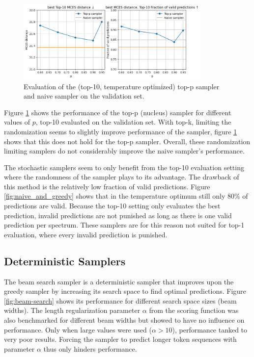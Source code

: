 \begin{figure}[h]
    \centering
    \includegraphics[width=0.85\textwidth]{figures/results/samplers/top-p.png}
    \caption{Evaluation of the (top-10, temperature optimized) top-p sampler and naive sampler on the validation set.}
    \label{fig:top-p}
\end{figure}

Figure \ref{fig:top-p} shows the performance of the top-p (nucleus) sampler for different values of $p$, top-10 evaluated on the validation set.
With top-k, limiting the randomization seems to slightly improve performance of the sampler, figure \ref{fig:top-p} shows that this does not hold for the top-p sampler.
Overall, these randomization limiting samplers do not considerably improve the naive sampler's performance.

The stochastic samplers seem to only benefit from the top-10 evaluation setting where the randomness of the sampler plays to its advantage.
The drawback of this method is the relatively low fraction of valid predictions.
Figure \ref{fig:naive_and_greedy} shows that in the temperature optimum still only $80\%$ of predictions are valid.
Because the top-10 setting only evaluates the best prediction, invalid predictions are not punished as long as there is one valid prediction per spectrum.
These samplers are for this reason not suited for top-1 evaluation, where every invalid prediction is punished.


\subsection{Deterministic Samplers}

The beam search sampler is a deterministic sampler that improves upon the greedy sampler by increasing its search space to find optimal predictions.
Figure \ref{fig:beam-search} shows its performance for different search space sizes (beam widths).
The length regularization parameter $\alpha$ from the scoring function was also benchmarked for different beam widths but showed to have no influence on performance.
Only when large values were used ($\alpha > 10$), performance tanked to very poor results.
Forcing the sampler to predict longer token sequences with parameter $\alpha$ thus only hinders performance.

